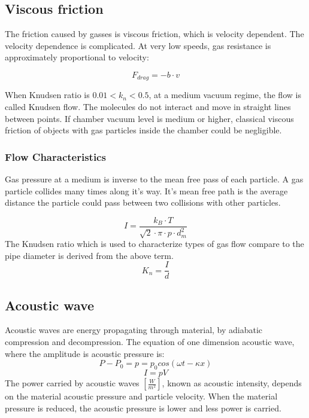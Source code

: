 \documentclass[\main/master.tex]{subfiles}
\begin{document}
\subsection{Viscous friction}
The friction caused by gasses is viscous friction, which is velocity dependent. The velocity dependence is complicated. At very low speeds, gas resistance is approximately proportional to velocity: 

\begin{equation}
F_{drag} = -b\cdot v  \label{eqn:energy-mass-equivalence-relation}
\end{equation}
\par\noindent
When Knudsen ratio is $0.01<k_n<0.5$, at a medium vacuum regime, the flow is called Knudsen flow. The molecules do not interact and move in straight lines between points. If chamber vacuum level is medium or higher, classical viscous friction of objects with gas particles inside the chamber could be negligible.

\subsubsection{Flow Characteristics}
Gas pressure at a medium is inverse to the mean free pass of each particle. A gas particle collides many times along it's way. It's mean free path is the average distance the particle could pass between two collisions with other particles. 


\begin{equation}
I = \frac{k_B\cdot T}{\sqrt{2}\cdot\pi\cdot p\cdot d_m^2}     \label{eqn:mean-free-pass}
\end{equation}
The Knudsen ratio which is used to characterize types of gas flow compare to the pipe diameter is derived from the above term.
\begin{equation}
K_n = \frac{I}{d}     \label{eqn:mean-free-pass}
\end{equation}

\subsection{Acoustic wave}
Acoustic waves are energy propagating through material, by adiabatic compression and decompression. The equation of one dimension acoustic wave, where the amplitude is acoustic pressure is:
\begin{equation}
P-P_0 = p = p_0cos(\omega t -\kappa x)       \label{eqn:acoustic_pressure}
\end{equation}
\begin{equation}
I = pV      \label{eqn:acoustic_intensity}
\end{equation} 
The power carried by acoustic waves $[\frac{W}{m^2}]$, known as acoustic intensity, depends on the material acoustic pressure and particle velocity. When the material pressure is reduced, the acoustic pressure is lower and less power is carried.
\end{document}
